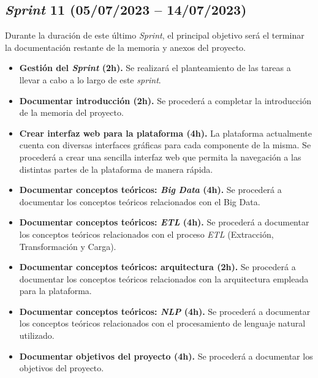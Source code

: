 

\subsection{\textit{Sprint} 11 (05/07/2023 -- 14/07/2023)}

Durante la duración de este último \textit{Sprint}, el principal objetivo será el terminar la documentación restante de la memoria y anexos del proyecto.

\begin{itemize}

    \item \textbf{Gestión del \textit{Sprint} (2h).} Se realizará el planteamiento de las tareas a llevar a cabo a lo largo de este \textit{sprint}.

    \item \textbf{Documentar introducción (2h).} Se procederá a completar la introducción de la memoria del proyecto.

    \item \textbf{Crear interfaz web para la plataforma (4h).} La plataforma actualmente cuenta con diversas interfaces gráficas para cada componente de la misma. Se procederá a crear una sencilla interfaz web que permita la navegación a las distintas partes de la plataforma de manera rápida.

    \item \textbf{Documentar conceptos teóricos: \textit{Big Data} (4h).} Se procederá a documentar los conceptos teóricos relacionados con el Big Data.

    \item \textbf{Documentar conceptos teóricos: \textit{ETL} (4h).} Se procederá a documentar los conceptos teóricos relacionados con el proceso \textit{ETL} (Extracción, Transformación y Carga).

    \item \textbf{Documentar conceptos teóricos: arquitectura (2h).} Se procederá a documentar los conceptos teóricos relacionados con la arquitectura empleada para la plataforma.

    \item \textbf{Documentar conceptos teóricos: \textit{NLP} (4h).} Se procederá a documentar los conceptos teóricos relacionados con el procesamiento de lenguaje natural utilizado.

    \item \textbf{Documentar objetivos del proyecto (4h).} Se procederá a documentar los objetivos del proyecto.


\end{itemize}
